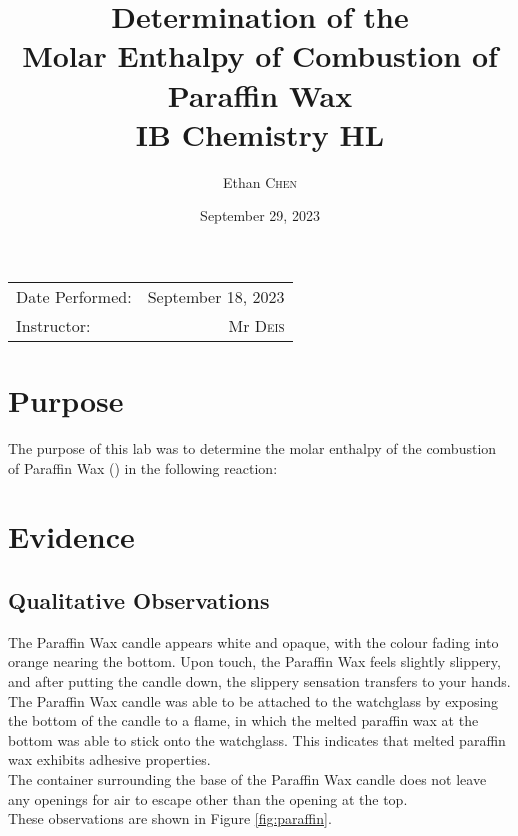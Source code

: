 \documentclass[
	letterpaper, %
	12pt, %
]{CSUniSchoolLabReport}
\title{Determination of the \\ Molar Enthalpy of Combustion of Paraffin Wax \\ IB Chemistry HL} %
\author{Ethan \textsc{Chen}} %
\date{September 29, 2023} %
\begin{document}
\maketitle %

\begin{center}
  \begin{tabular}{l r}
    Date Performed: & September 18, 2023 \\ %
    Instructor:     & Mr \textsc{Deis}   %
  \end{tabular}
\end{center}



\section{Purpose}

The purpose of this lab was to determine the molar enthalpy of the combustion of Paraffin Wax () in the following reaction:

\begin{center}
\end{center}


\section{Evidence}

\subsection{Qualitative Observations}

The Paraffin Wax candle appears white and opaque, with the colour fading into orange nearing the bottom.
Upon touch, the Paraffin Wax feels slightly slippery, and after putting the candle down, the slippery sensation
transfers to your hands.
\\
The Paraffin Wax candle was able to be attached to the watchglass by exposing the
bottom of the candle to a flame, in which the melted paraffin wax at the bottom
was able to stick onto the watchglass. This indicates that melted paraffin wax exhibits
adhesive properties.
\\
The container surrounding the base of the Paraffin Wax candle does not leave
any openings for air to escape other than the opening at the top.
\\
These observations are shown in Figure \ref*{fig:paraffin}.
\end{document}
